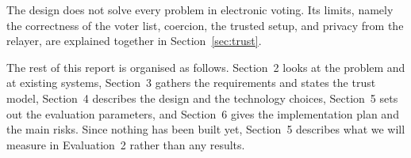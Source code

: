 The design does not solve every problem in electronic voting. Its limits,
namely the correctness of the voter list, coercion, the trusted setup, and
privacy from the relayer, are explained together in Section~\ref{sec:trust}.

The rest of this report is organised as follows. Section~2 looks at the
problem and at existing systems, Section~3 gathers the requirements and states
the trust model, Section~4 describes the design and the technology choices,
Section~5 sets out the evaluation parameters, and Section~6 gives the
implementation plan and the main risks. Since nothing has been built yet,
Section~5 describes what we will measure in Evaluation~2 rather than any
results.

